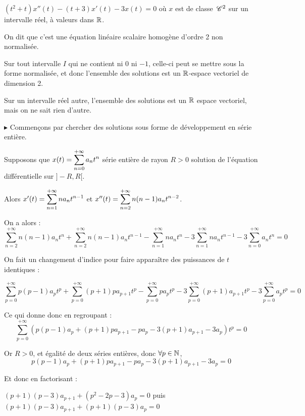 \begin{exemple}
    $(t^2 + t) x''(t) - (t + 3) x'(t) - 3x(t) = 0$ où $x$ est de classe 
    $\,\mathscr C^{2}$ sur un intervalle réel, à valeurs dans $\mathbb{R}$.

    On dit que c'est une équation linéaire scalaire homogène d'ordre 2 non normalisée. 

    Sur tout intervalle $I$ qui ne contient ni $0$ ni $-1$, celle-ci peut se mettre sous 
    la forme normalisée, et donc l'ensemble des solutions est un $\mathbb{R}$-espace vectoriel
    de dimension 2.

    Sur un intervalle réel autre, l'ensemble des solutions est un $\mathbb{R}$ espace vectoriel, mais 
    on ne sait rien d'autre. 

    \avspace $\blacktriangleright$ Commençons par chercher des solutions sous forme de 
    développement en série entière. 


    \svspace Supposons que $x(t) = \displaystyle \sum_{n = 0}^{+ \infty} a_n t^n$ série entière de rayon 
    $R > 0$ solution de l'équation différentielle sur $]-R, R[$.

    Alors $x'(t) = \displaystyle \sum_{n = 1}^{+ \infty} n a_n t^{n - 1}$ et $x''(t) = \displaystyle \sum_{n = 2}^{+ \infty} n (n - 1) a_n t^{n - 2}$.

    On a alors : 
    $$\sum_{n = 2}^{+ \infty} n(n - 1) a_n t^n + \sum_{n = 2}^{+ \infty} n(n - 1) a_n t^{n - 1} - \sum_{n = 1}^{+ \infty} n a_n t^n - 3 \sum_{n = 1}^{+ \infty} n a_n t^{n - 1} - 3 \sum_{n = 0}^{+ \infty} a_n t^n = 0$$

    On fait un changement d'indice pour faire apparaître des puissances de $t$ identiques :

    $$\sum_{p = 0}^{+ \infty} p(p - 1) a_p t^p + \sum_{p = 0}^{+ \infty} (p + 1) p a_{p + 1} t^p - \sum_{p = 0}^{+ \infty} p a_p t^p - 3 \sum_{p = 0}^{+ \infty} (p + 1) a_{p + 1} t^p - 3 \sum_{p = 0}^{+ \infty} a_p t^p = 0$$

    Ce qui donne donc en regroupant : 
    $$\sum_{p = 0}^{+ \infty} \left( p(p - 1) a_p + (p + 1) p a_{p + 1} - p a_p - 3 (p + 1) a_{p + 1} - 3 a_p \right) t^p = 0$$

    Or $R > 0$, et égalité de deux séries entières, donc $\forall p \in \mathbb{N}$, 
    $$p(p - 1) a_p + (p + 1) p a_{p + 1} - p a_p - 3 (p + 1) a_{p + 1} - 3 a_p = 0$$

    Et donc en factorisant : 

    $(p + 1)(p - 3) a_{p + 1} + (p^2 -2p - 3) a_p = 0$ puis 
    $(p + 1)(p - 3) a_{p + 1} + (p + 1)(p - 3) a_p = 0$


\end{exemple}
